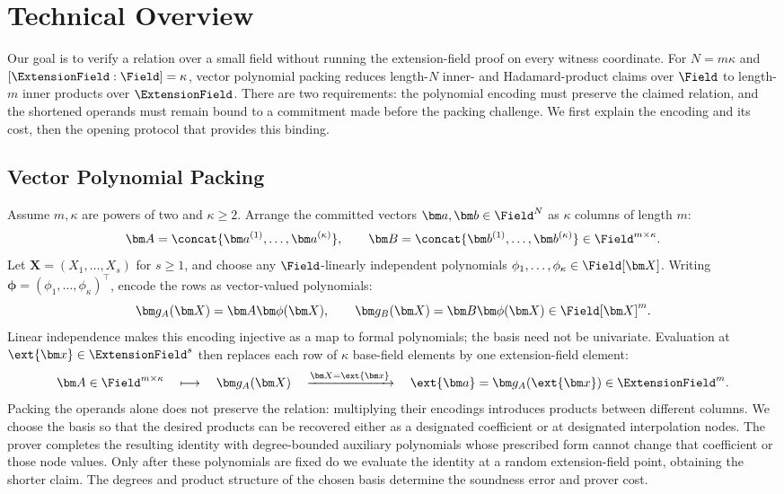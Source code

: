 \section{Technical Overview}
\label{sec:overview}

Our goal is to verify a relation over a small field without running
the extension-field proof on every witness coordinate.
For \(N=m\kappa\) and \([\ExtensionField:\Field]=\kappa\),
vector polynomial packing reduces length-\(N\) inner- and Hadamard-product
claims over \(\Field\) to length-\(m\) inner products over
\(\ExtensionField\).
There are two requirements: the polynomial encoding must preserve
the claimed relation, and the shortened operands must remain bound
to a commitment made before the packing challenge.
We first explain the encoding and its cost, then the opening
protocol that provides this binding.

\subsection{Vector Polynomial Packing}
\label{sec:dualPhase}

Assume \(m,\kappa\) are powers of two and \(\kappa\geq2\).
Arrange the committed vectors \(\bm a,\bm b\in\Field^N\) as
\(\kappa\) columns of length \(m\):
\[
    \bm A=\concat{\bm a^{(1)},\ldots,\bm a^{(\kappa)}},
    \qquad
    \bm B=\concat{\bm b^{(1)},\ldots,\bm b^{(\kappa)}}
    \in\Field^{m\times\kappa}.
\]
Let \(\bm X=(X_1,\ldots,X_s)\) for \(s\geq1\), and choose any
\(\Field\)-linearly independent polynomials
\(\phi_1,\ldots,\phi_\kappa\in\Field[\bm X]\).
Writing \(\bm\phi=(\phi_1,\ldots,\phi_\kappa)^\top\), encode
the rows as vector-valued polynomials:
\begin{equation}
    \bm g_A(\bm X)=\bm A\bm\phi(\bm X),
    \qquad
    \bm g_B(\bm X)=\bm B\bm\phi(\bm X)
    \in\Field[\bm X]^m.
\label{eq:overview-packing}
\end{equation}
Linear independence makes this encoding injective as a map to
formal polynomials; the basis need not be univariate.
Evaluation at \(\ext{\bm x}\in\ExtensionField^s\) then replaces
each row of \(\kappa\) base-field elements by one
extension-field element:
\[
    \bm A\in\Field^{m\times\kappa}
    \quad\longmapsto\quad
    \bm g_A(\bm X)
    \quad\xrightarrow{\bm X=\ext{\bm x}}\quad
    \ext{\bm a}=\bm g_A(\ext{\bm x})\in\ExtensionField^m.
\]
Packing the operands alone does not preserve the relation:
multiplying their encodings introduces products between different
columns. We choose the basis so that the desired products can be
recovered either as a designated coefficient or at designated
interpolation nodes.
The prover completes the resulting identity with degree-bounded
auxiliary polynomials whose prescribed form cannot change that
coefficient or those node values.
Only after these polynomials are fixed do we evaluate the identity
at a random extension-field point, obtaining the shorter claim.
The degrees and product structure of the chosen basis determine
the soundness error and prover cost.


